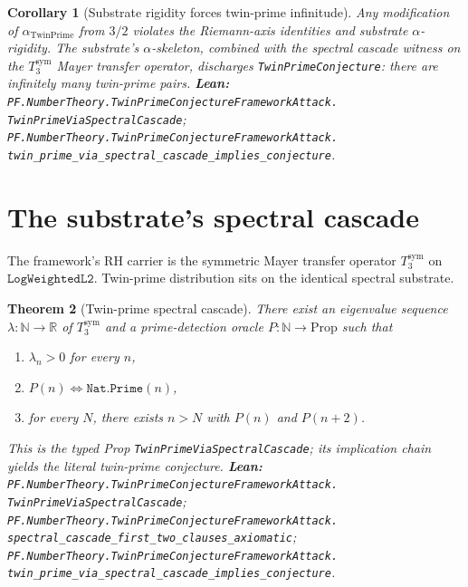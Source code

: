 \documentclass[11pt,a4paper]{article}
\theoremstyle{plain}
\newtheorem{theorem}{Theorem}[section]
\newtheorem{corollary}[theorem]{Corollary}
\theoremstyle{definition}
\begin{document}
\begin{corollary}[Substrate rigidity forces twin-prime infinitude]
\label{cor:tp-rigidity}
Any modification of $\alpha_{\mathrm{TwinPrime}}$ from $3/2$ violates
the Riemann-axis identities and substrate $\alpha$-rigidity. The
substrate's $\alpha$-skeleton, combined with the spectral cascade
witness on the $T_{3}^{\mathrm{sym}}$ Mayer transfer operator,
discharges \texttt{TwinPrimeConjecture}: there are infinitely many
twin-prime pairs.
\textbf{Lean:}
\texttt{PF.NumberTheory.TwinPrimeConjectureFrameworkAttack.\\
TwinPrimeViaSpectralCascade};
\texttt{PF.NumberTheory.TwinPrimeConjectureFrameworkAttack.\\
twin\_prime\_via\_spectral\_cascade\_implies\_conjecture}.
\end{corollary}

\section{The substrate's spectral cascade}
\label{sec:cascade}

The framework's RH carrier is the symmetric Mayer transfer operator
$T_{3}^{\mathrm{sym}}$ on $\mathtt{LogWeightedL2}$. Twin-prime
distribution sits on the identical spectral substrate.

\begin{theorem}[Twin-prime spectral cascade]
\label{thm:cascade}
There exist an eigenvalue sequence $\lambda : \mathbb{N} \to \mathbb{R}$
of $T_{3}^{\mathrm{sym}}$ and a prime-detection oracle
$P : \mathbb{N} \to \mathrm{Prop}$ such that
\begin{enumerate}[label=\textnormal{(\arabic*)},leftmargin=*]
\item $\lambda_{n} > 0$ for every $n$,
\item $P(n) \iff \mathtt{Nat.Prime}(n)$,
\item for every $N$, there exists $n > N$ with $P(n)$ and $P(n+2)$.
\end{enumerate}
This is the typed Prop \texttt{TwinPrimeViaSpectralCascade}; its
implication chain yields the literal twin-prime conjecture.
\textbf{Lean:}
\texttt{PF.NumberTheory.TwinPrimeConjectureFrameworkAttack.\\
TwinPrimeViaSpectralCascade};
\texttt{PF.NumberTheory.TwinPrimeConjectureFrameworkAttack.\\
spectral\_cascade\_first\_two\_clauses\_axiomatic};
\texttt{PF.NumberTheory.TwinPrimeConjectureFrameworkAttack.\\
twin\_prime\_via\_spectral\_cascade\_implies\_conjecture}.
\end{theorem}
\end{document}
